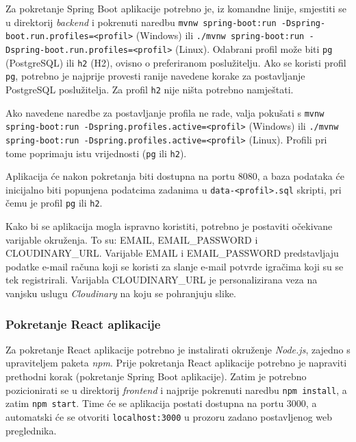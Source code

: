 			{Za pokretanje Spring Boot aplikacije potrebno je, iz komandne linije, smjestiti se u direktorij \textit{backend} i pokrenuti naredbu \texttt{mvnw spring-boot:run -Dspring-boot.run.profiles=<profil>} (Windows) ili \texttt{./mvnw spring-boot:run -Dspring-boot.run.profiles=<profil>} (Linux). Odabrani profil može biti \texttt{pg} (PostgreSQL) ili \texttt{h2} (H2), ovisno o preferiranom poslužitelju. Ako se koristi profil \texttt{pg}, potrebno je najprije provesti ranije navedene korake za postavljanje PostgreSQL poslužitelja. Za profil \texttt{h2} nije ništa potrebno namještati.} 
			
			{Ako navedene naredbe za postavljanje profila ne rade, valja pokušati s \texttt{mvnw spring-boot:run -Dspring.profiles.active=<profil>} (Windows) ili \texttt{./mvnw spring-boot:run -Dspring.profiles.active=<profil>} (Linux). Profili pri tome poprimaju istu vrijednosti (\texttt{pg} ili \texttt{h2}).} 
			
			{Aplikacija će nakon pokretanja biti dostupna na portu 8080, a baza podataka će inicijalno biti popunjena podatcima zadanima u \texttt{data-<profil>.sql} skripti, pri čemu je profil \texttt{pg} ili \texttt{h2}.}
			
			{Kako bi se aplikacija mogla ispravno koristiti, potrebno je postaviti očekivane varijable okruženja. To su: EMAIL, EMAIL\_PASSWORD i CLOUDINARY\_URL. Varijable EMAIL i EMAIL\_PASSWORD predstavljaju podatke e-mail računa koji se koristi za slanje e-mail potvrde igračima koji su se tek registrirali. Varijabla CLOUDINARY\_URL je personalizirana veza na vanjsku uslugu \textit{Cloudinary} na koju se pohranjuju slike.}
			
 			\subsubsection{Pokretanje React aplikacije}
			
			{Za pokretanje React aplikacije potrebno je instalirati okruženje \textit{Node.js}, zajedno s upraviteljem paketa \textit{npm}. Prije pokretanja React aplikacije potrebno je napraviti prethodni korak (pokretanje Spring Boot aplikacije). Zatim je potrebno pozicionirati se u direktorij \textit{frontend} i najprije pokrenuti naredbu \texttt{npm install}, a zatim \texttt{npm start}. Time će se aplikacija postati dostupna na portu 3000, a automatski će se otvoriti \texttt{localhost:3000} u prozoru zadano postavljenog web preglednika.}
			
			\eject 